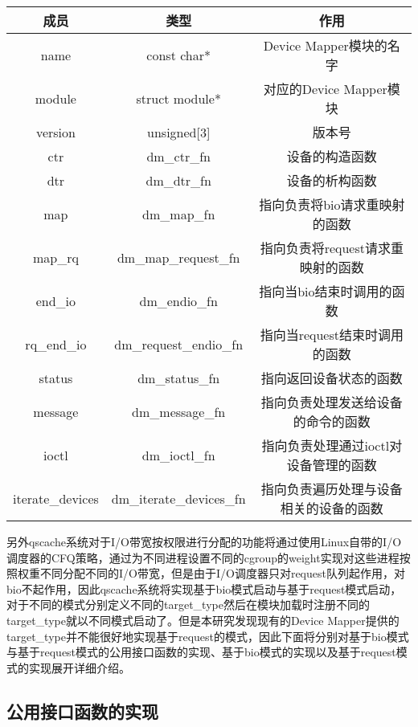 \begin{table}[!htbp]
    \centering
    \begin{tabular}{ccc} 
        \toprule
        成员 & 类型 & 作用\\
        \midrule
        name & const char* & Device Mapper模块的名字 \\ 
        module & struct module* & 对应的Device Mapper模块 \\ 
        version & unsigned[3] & 版本号 \\ 
        ctr & dm\_ctr\_fn & 设备的构造函数 \\ 
        dtr & dm\_dtr\_fn & 设备的析构函数 \\ 
        map & dm\_map\_fn & 指向负责将bio请求重映射的函数 \\ 
        map\_rq & dm\_map\_request\_fn & 指向负责将request请求重映射的函数 \\ 
        end\_io & dm\_endio\_fn & 指向当bio结束时调用的函数 \\ 
        rq\_end\_io & dm\_request\_endio\_fn & 指向当request结束时调用的函数 \\ 
        status & dm\_status\_fn & 指向返回设备状态的函数 \\ 
        message & dm\_message\_fn & 指向负责处理发送给设备的命令的函数 \\ 
        ioctl & dm\_ioctl\_fn & 指向负责处理通过ioctl对设备管理的函数 \\ 
        iterate\_devices & dm\_iterate\_devices\_fn & 指向负责遍历处理与设备相关的设备的函数 \\ 
        \bottomrule
    \end{tabular}
\end{table}

另外qscache系统对于I/O带宽按权限进行分配的功能将通过使用Linux自带的I/O调度器的CFQ策略，通过为不同进程设置不同的cgroup的weight实现对这些进程按照权重不同分配不同的I/O带宽，但是由于I/O调度器只对request队列起作用，对bio不起作用，因此qscache系统将实现基于bio模式启动与基于request模式启动，对于不同的模式分别定义不同的target\_type然后在模块加载时注册不同的target\_type就以不同模式启动了。但是本研究发现现有的Device Mapper提供的target\_type并不能很好地实现基于request的模式，因此下面将分别对基于bio模式与基于request模式的公用接口函数的实现、基于bio模式的实现以及基于request模式的实现展开详细介绍。

\subsection{公用接口函数的实现}

